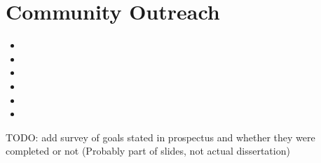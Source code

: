 \documentclass{report}
\begin{document}
\fi

\chapter{Community Outreach}


\begin{itemize} 
        \item {}
        \item {}
        \item {}     
        \item {}
        \item {}              
        \item {}
\end{itemize}
TODO: add survey of goals stated in prospectus and whether they were completed or not (Probably part of slides, not actual dissertation)




\ifstandalone


\end{document}
